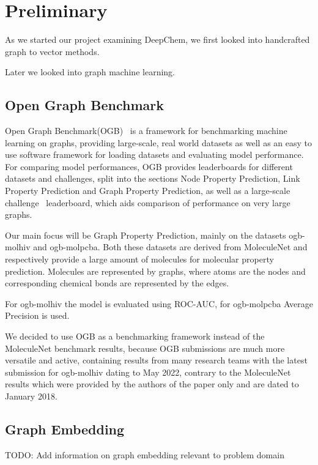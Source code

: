 \section{Preliminary}

As we started our project examining DeepChem, we first looked into handcrafted graph to vector methods.

Later we looked into graph machine learning.

\subsection{Open Graph Benchmark}
Open Graph Benchmark(OGB)~\cite{2021ogb} is a framework for benchmarking machine learning on graphs, providing large-scale, real world datasets as well as an easy to use software framework for loading  datasets and evaluating model performance.
For comparing model performances, OGB provides leaderboards for different datasets and challenges, split into the sections Node Property Prediction, Link Property Prediction and Graph Property Prediction, as well as a large-scale challenge~\cite{hu2021ogblsc} leaderboard, which aids comparison of performance on very large graphs.

Our main focus will be Graph Property Prediction, mainly on the datasets ogb-molhiv and ogb-molpcba. Both these datasets are derived from MoleculeNet and respectively provide a large amount of molecules for molecular property prediction. Molecules are represented by graphs, where atoms are the nodes and corresponding chemical bonds are represented by the edges. 

For ogb-molhiv the model is evaluated using ROC-AUC, for ogb-molpcba Average Precision is used.

We decided to use OGB as a benchmarking framework instead of the MoleculeNet benchmark results, because OGB submissions are much more versatile and active, containing results from many research teams with the latest submission for ogb-molhiv dating to May 2022, contrary to the MoleculeNet results which were provided by the authors of the paper only and are dated to January 2018. 


\subsection{Graph Embedding}
TODO: Add information on graph embedding relevant to problem domain

